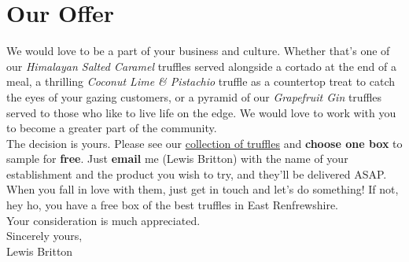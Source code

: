 \documentclass[11pt, english]{article}
\begin{document}
\section{Our Offer}

\footnotesize We would love to be a part of your business and culture. Whether that's one of our \textit{Himalayan Salted Caramel} truffles served alongside a cortado at the end of a meal, a thrilling \textit{Coconut Lime \& Pistachio} truffle as a countertop treat to catch the eyes of your gazing customers, or a pyramid of our \textit{Grapefruit Gin} truffles served to those who like to live life on the edge. We would love to work with you to become a greater part of the community.\\

The decision is yours. Please see our \href{http://vtctruffles.co.uk/Truffles.html}{collection of truffles} and \textbf{choose one box} to sample for \textbf{free}. Just \textbf{email} me (Lewis Britton) with the name of your establishment and the product you wish to try, and they'll be delivered ASAP. When you fall in love with them, just get in touch and let's do something! If not, hey ho, you have a free box of the best truffles in East Renfrewshire.\\

Your consideration is much appreciated.\\

Sincerely yours,\\
Lewis Britton
\end{document}

